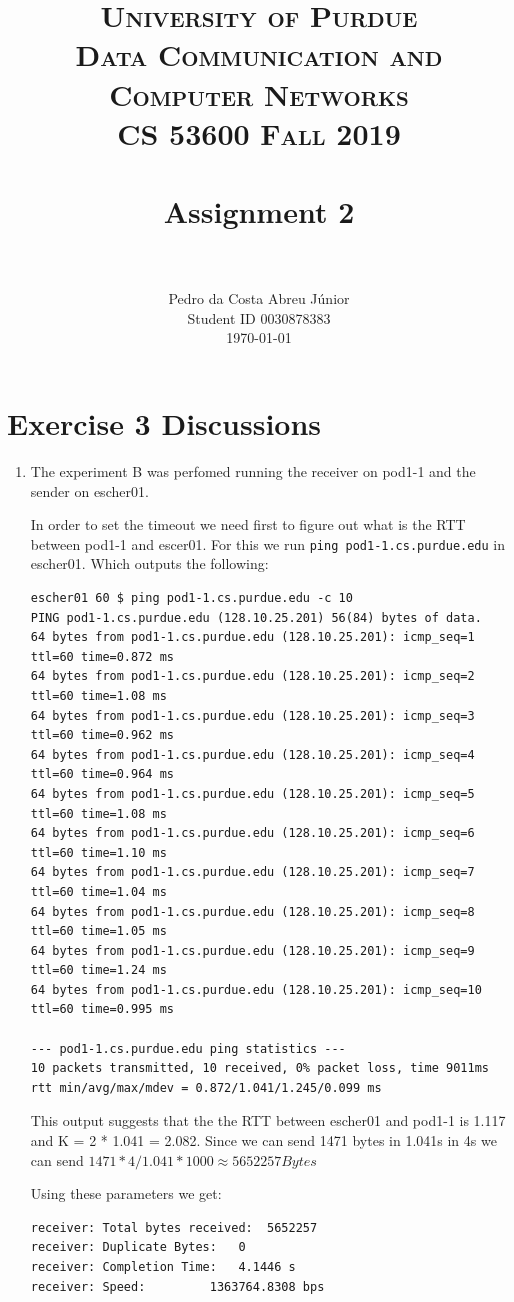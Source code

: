 \documentclass[paper=a4, fontsize=11pt]{scrartcl}
\title{
		\usefont{OT1}{bch}{b}{n}
		\normalfont \normalsize \textsc{University of Purdue\\
      Data Communication and Computer Networks\\
      CS 53600 Fall 2019} \\ [25pt]
		\horrule{0.5pt} \\[0.4cm]
		\huge Assignment 2\\
		\horrule{2pt} \\[0.5cm]
}
\author{
		\normalfont\normalsize Pedro da Costa Abreu Júnior\\ [-5pt]
    \normalsize Student ID 0030878383\\[-5pt]
    \normalsize \today
}
\date{}
\numberwithin{equation}{section}		%
\numberwithin{figure}{section}			%
\numberwithin{table}{section}				%
\begin{document}
\maketitle

\section*{Exercise 3 Discussions}

\begin{enumerate}
\item The experiment B was perfomed running the receiver on pod1-1 and the sender on escher01.

  In order to set the timeout we need first to figure out what is the RTT between pod1-1 and escer01.
  For this we run \verb|ping pod1-1.cs.purdue.edu| in escher01. Which outputs the following:

\begin{verbatim}
escher01 60 $ ping pod1-1.cs.purdue.edu -c 10
PING pod1-1.cs.purdue.edu (128.10.25.201) 56(84) bytes of data.
64 bytes from pod1-1.cs.purdue.edu (128.10.25.201): icmp_seq=1 ttl=60 time=0.872 ms
64 bytes from pod1-1.cs.purdue.edu (128.10.25.201): icmp_seq=2 ttl=60 time=1.08 ms
64 bytes from pod1-1.cs.purdue.edu (128.10.25.201): icmp_seq=3 ttl=60 time=0.962 ms
64 bytes from pod1-1.cs.purdue.edu (128.10.25.201): icmp_seq=4 ttl=60 time=0.964 ms
64 bytes from pod1-1.cs.purdue.edu (128.10.25.201): icmp_seq=5 ttl=60 time=1.08 ms
64 bytes from pod1-1.cs.purdue.edu (128.10.25.201): icmp_seq=6 ttl=60 time=1.10 ms
64 bytes from pod1-1.cs.purdue.edu (128.10.25.201): icmp_seq=7 ttl=60 time=1.04 ms
64 bytes from pod1-1.cs.purdue.edu (128.10.25.201): icmp_seq=8 ttl=60 time=1.05 ms
64 bytes from pod1-1.cs.purdue.edu (128.10.25.201): icmp_seq=9 ttl=60 time=1.24 ms
64 bytes from pod1-1.cs.purdue.edu (128.10.25.201): icmp_seq=10 ttl=60 time=0.995 ms

--- pod1-1.cs.purdue.edu ping statistics ---
10 packets transmitted, 10 received, 0% packet loss, time 9011ms
rtt min/avg/max/mdev = 0.872/1.041/1.245/0.099 ms
\end{verbatim}

This output suggests that the the RTT between escher01 and pod1-1 is 1.117 and K = 2 * 1.041 = 2.082.
Since we can send 1471 bytes in 1.041s in 4s we can send
$1471 * 4 / 1.041 * 1000 \approx 5652257 Bytes$

Using these parameters we get:

\begin{verbatim}
receiver: Total bytes received:	 5652257
receiver: Duplicate Bytes:	 0
receiver: Completion Time:	 4.1446 s
receiver: Speed:		 1363764.8308 bps
\end{verbatim}


\end{enumerate}
\end{document}
